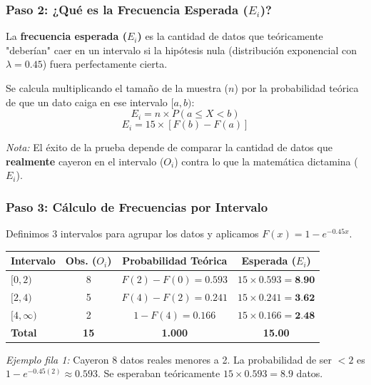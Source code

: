 \documentclass[aspectratio=1610, 10pt]{beamer}
\begin{document}
\begin{frame}
\frametitle{Paso 2: ¿Qué es la Frecuencia Esperada ($E_i$)?}
La \textbf{frecuencia esperada ($E_i$)} es la cantidad de datos que teóricamente "deberían" caer en un intervalo si la hipótesis nula (distribución exponencial con $\lambda=0.45$) fuera perfectamente cierta.

\vspace{0.3cm}
Se calcula multiplicando el tamaño de la muestra ($n$) por la probabilidad teórica de que un dato caiga en ese intervalo $[a, b)$:
$$E_i = n \times P(a \leq X < b)$$
$$E_i = 15 \times [F(b) - F(a)]$$

\vspace{0.2cm}
\textit{Nota:} El éxito de la prueba depende de comparar la cantidad de datos que \textbf{realmente} cayeron en el intervalo ($O_i$) contra lo que la matemática dictamina ($E_i$).
\end{frame}

\begin{frame}
\frametitle{Paso 3: Cálculo de Frecuencias por Intervalo}
Definimos 3 intervalos para agrupar los datos y aplicamos $F(x) = 1 - e^{-0.45x}$.

\vspace{0.2cm}
\begin{center}
\small
\begin{tabular}{lccc}
\toprule
\textbf{Intervalo} & \textbf{Obs. ($O_i$)} & \textbf{Probabilidad Teórica} & \textbf{Esperada ($E_i$)} \\ \midrule
$[0, 2)$ & 8 & $F(2) - F(0) = 0.593$ & $15 \times 0.593 = \textbf{8.90}$ \\
$[2, 4)$ & 5 & $F(4) - F(2) = 0.241$ & $15 \times 0.241 = \textbf{3.62}$ \\
$[4, \infty)$ & 2 & $1 - F(4) = 0.166$ & $15 \times 0.166 = \textbf{2.48}$ \\ \midrule
\textbf{Total} & \textbf{15} & \textbf{1.000} & \textbf{15.00} \\ \bottomrule
\end{tabular}
\end{center}

\vspace{0.2cm}
\footnotesize{
\textit{Ejemplo fila 1:} Cayeron 8 datos reales menores a 2. La probabilidad de ser $< 2$ es $1 - e^{-0.45(2)} \approx 0.593$. Se esperaban teóricamente $15 \times 0.593 = 8.9$ datos.}
\end{frame}
\end{document}
